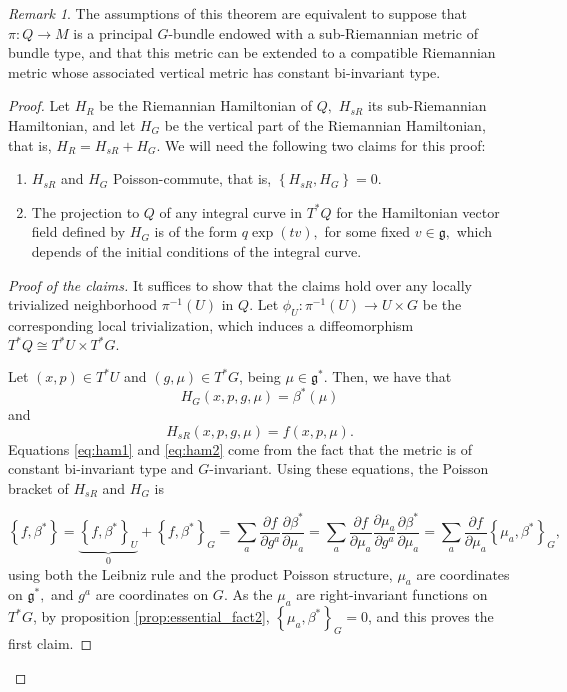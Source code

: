 \documentclass[12pt, letterpaper, reqno]{amsart}
\theoremstyle{definition}
\theoremstyle{plain}
\theoremstyle{remark}
\newtheorem{rem}{Remark}
\begin{document}
\begin{rem}
The assumptions of this theorem are equivalent to suppose that $ \pi: Q \rightarrow  M $ is a principal $ G $-bundle endowed with a sub-Riemannian metric of bundle type, and that this metric can be extended to a compatible Riemannian metric whose associated vertical metric has constant bi-invariant type.	
\end{rem}
\begin{proof}
	Let $ H_R $ be the Riemannian Hamiltonian of $ Q, $ $ H_{sR} $ its sub-Riemannian Hamiltonian, and let $ H_G$ be the vertical part of the Riemannian Hamiltonian, that is, $ H_R = H_{sR}+H_G. $  We will need the following two claims for this proof:
	\begin{enumerate}
		\item $ H_{sR} $ and $ H_G $ Poisson-commute, that is, $ \left\{ H_{sR}, H_G \right\} =0. $ 
		\item The projection to $ Q $ of any integral curve in $ T^*Q $ for the Hamiltonian vector field defined by $ H_G $ is of the form $ q \operatorname{exp}(tv),  $ for some fixed $ v\in \mathfrak{g}, $ which depends of the initial conditions of the integral curve.
	\end{enumerate}
	\begin{proof}
		[Proof of the claims] It suffices to show that the claims hold over any locally trivialized neighborhood $ \pi^{-1}(U) $ in $ Q. $ Let $ \phi_U: \pi^{-1}(U) \rightarrow U\times G $ be the corresponding local trivialization, which induces a diffeomorphism $ T^*Q \cong T^*U\times T^*G.$

		Let $ (x,p)\in T^* U $ and $ (g,\mu)\in T^*G $, being $ \mu\in \mathfrak{g}^*. $ Then, we have that
		\begin{equation}\label{eq:ham1}
			H_G(x,p,g,\mu) = \beta^*(\mu)
		\end{equation}
		and
		\begin{equation}\label{eq:ham2}
			H_{sR}(x,p,g,\mu)= f(x,p,\mu).	
		\end{equation}
		Equations \eqref{eq:ham1} and \eqref{eq:ham2} come from the fact that the metric is of constant bi-invariant type and $ G $-invariant. Using these equations, the Poisson bracket of $ H_{sR} $ and $ H_{G} $ is

		$$ \left\{ f,\beta^* \right\} = \underbrace{\left\{ f,\beta^* \right\}_U}_0 + \left\{ f,\beta^* \right\}_G = \sum^{}_{a} \frac{\partial f}{\partial g^a} \frac{\partial \beta^*}{\partial \mu_a} = \sum^{}_{a} \frac{\partial f}{\partial \mu_a} \frac{\partial \mu_a}{\partial g^a} \frac{\partial \beta^*}{\partial \mu_a}  = \sum^{}_{a} \frac{\partial f}{\partial \mu_a} \left\{ \mu_a, \beta^* \right\}_G, $$ 
		using both the Leibniz rule and the product Poisson structure, $ \mu_a $ are coordinates on $ \mathfrak{g}^*, $ and $ g^a $ are coordinates on $ G. $ As the $ \mu_a $ are right-invariant functions on $ T^*G$, by proposition \ref{prop:essential_fact2}, $ \left\{ \mu_a,\beta^* \right\}_G =0 $, and this proves the first claim.


\end{proof}
\end{proof}
\end{document}
